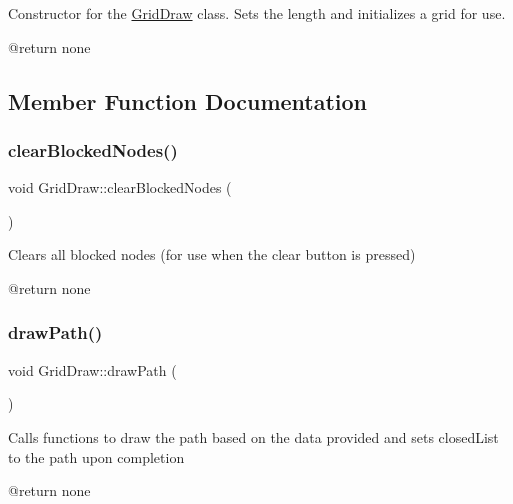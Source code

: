 Constructor for the \hyperlink{classGridDraw}{Grid\+Draw} class. Sets the length and initializes a grid for use. \begin{DoxyVerb}@return none\end{DoxyVerb}
 

\subsection{Member Function Documentation}
\mbox{\label{classGridDraw_a091e7771219ae06092243170f4f0af3e}} 
\subsubsection{\texorpdfstring{clear\+Blocked\+Nodes()}{clearBlockedNodes()}}
{\footnotesize\ttfamily void Grid\+Draw\+::clear\+Blocked\+Nodes (\begin{DoxyParamCaption}{ }\end{DoxyParamCaption})\hspace{0.3cm}{\ttfamily [inline]}}

Clears all blocked nodes (for use when the clear button is pressed) \begin{DoxyVerb}@return none\end{DoxyVerb}
 \mbox{\label{classGridDraw_af6f905b2a61590c2d8582798e54a7d02}} 
\subsubsection{\texorpdfstring{draw\+Path()}{drawPath()}}
{\footnotesize\ttfamily void Grid\+Draw\+::draw\+Path (\begin{DoxyParamCaption}{ }\end{DoxyParamCaption})\hspace{0.3cm}{\ttfamily [inline]}}

Calls functions to draw the path based on the data provided and sets closed\+List to the path upon completion \begin{DoxyVerb}@return none\end{DoxyVerb}
 \mbox{\label{classGridDraw_a72cff94711f11c2af81d66eef964d15b}} 

